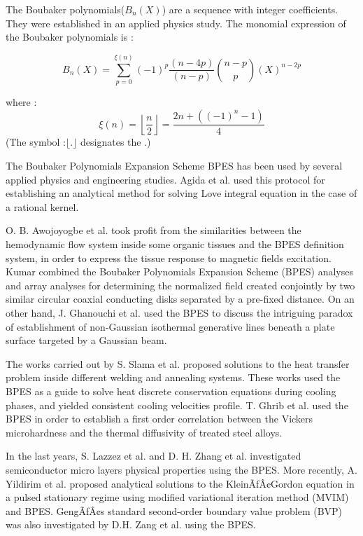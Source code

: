 \documentclass[12pt]{article}
\begin{document}

The Boubaker polynomials($B_n (X)$) are a sequence with integer coefficients. They were established in an applied physics study. The monomial expression of the Boubaker polynomials is :

$$B_n(X)=\sum_{p = 0}^{\xi(n)} (-1)^p \frac{(n-4p)}{(n-p)}\binom{n-p}{p}(X)^{n-2p}$$

where :
$$\xi(n)=\left \lfloor \frac{n}{2} \right \rfloor =\frac{2n+((-1)^n - 1)}{4}$$
(The symbol :$\lfloor . \rfloor$ designates the .)

The Boubaker Polynomials Expansion Scheme BPES has been used by several applied physics and engineering studies. Agida et al. used this protocol for establishing an analytical method for solving Love integral equation in the case of a rational kernel.

O. B. Awojoyogbe et al. took profit from the similarities between the hemodynamic flow system inside some organic tissues and the BPES definition system, in order to express the tissue response to magnetic fields excitation.
Kumar combined the Boubaker Polynomials Expansion Scheme (BPES) analyses and array analyses for determining the normalized field created conjointly by two similar circular coaxial conducting disks separated by a pre-fixed distance. On an other hand, J. Ghanouchi et al. used the BPES to discuss the intriguing paradox of establishment of non-Gaussian isothermal generative lines beneath a plate surface targeted by a Gaussian beam.

The works carried out by S. Slama et al. proposed solutions to the heat transfer problem inside different welding and annealing systems. These works used the BPES as a guide to solve heat discrete conservation equations during cooling phases, and yielded consistent cooling velocities profile. T. Ghrib et al. used the BPES in order to establish a first order correlation between the Vickers microhardness and the thermal diffusivity of treated steel alloys.

In the last years, S. Lazzez et al. and D. H. Zhang et al. investigated semiconductor micro layers physical properties using the BPES. More recently, A. Yildirim et al. proposed analytical solutions to the KleinÃƒÂ¢Gordon equation in a pulsed stationary regime using modified variational iteration method (MVIM) and BPES. GengÃƒÂ¢s standard second-order boundary value problem (BVP) was also investigated by D.H. Zang et al. using the BPES.
\end{document}
